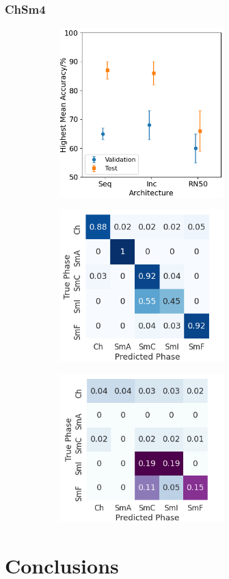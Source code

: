 \documentclass[12pt]{article}
\begin{document}
\subsubsection{ChSm4}
\begin{figure}[!h]
\centering
\begin{subfigure}{0.4\textwidth}
	\centering
	\includegraphics[width=2.5in]{images/Graphs/ChSm4.png}
	\caption{}
	\label{chsm4:graph}
\end{subfigure}

\begin{subfigure}{0.4\textwidth}
	\centering
	\includegraphics[width=2.5in]{images/ConMats/ChSm4_mean.png}
	\caption{}
	\label{chsm4:mean}
\end{subfigure}%
\begin{subfigure}{0.4\textwidth}
	\centering
	\includegraphics[width=2.5in]{images/ConMats/ChSm4_std.png}
	\caption{}
	\label{chsm4:std}
\end{subfigure}%
\caption{}
\label{chsm4:chsm4}
\end{figure}

\section{Conclusions}



\appendix
\appendixpage
\end{document}
